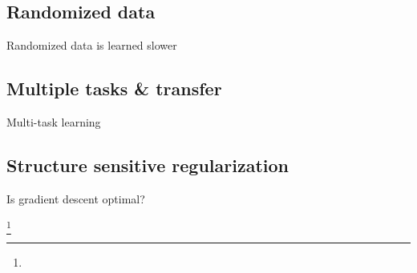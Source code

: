 \documentclass{beamer}
\newcommand\blfootnote[1]{%
  \begingroup
  \renewcommand\thefootnote{}\footnote{#1}%
  \addtocounter{footnote}{-1}%
  \endgroup
}
\begin{document}
\subsection{Randomized data}
\begin{frame}{Randomized data is learned slower}
\end{frame}

\subsection{Multiple tasks \& transfer}
\begin{frame}{Multi-task learning}
\end{frame}

\subsection{Structure sensitive regularization}
\begin{frame}{Is gradient descent optimal?}
\end{frame}

\begin{frame}[allowframebreaks]

\blfootnote{}
\end{frame}
\end{document}
